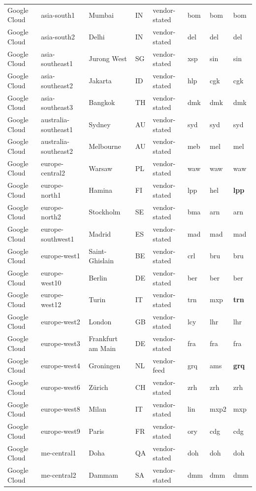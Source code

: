 \begin{longtable}{llllllll}
Google Cloud & asia-south1 & Mumbai & IN & vendor-stated & bom & bom & bom \\
Google Cloud & asia-south2 & Delhi & IN & vendor-stated & del & del & del \\
Google Cloud & asia-southeast1 & Jurong West & SG & vendor-stated & xsp & sin & sin \\
Google Cloud & asia-southeast2 & Jakarta & ID & vendor-stated & hlp & cgk & cgk \\
Google Cloud & asia-southeast3 & Bangkok & TH & vendor-stated & dmk & dmk & dmk \\
Google Cloud & australia-southeast1 & Sydney & AU & vendor-stated & syd & syd & syd \\
Google Cloud & australia-southeast2 & Melbourne & AU & vendor-stated & meb & mel & mel \\
Google Cloud & europe-central2 & Warsaw & PL & vendor-stated & waw & waw & waw \\
Google Cloud & europe-north1 & Hamina & FI & vendor-stated & lpp & hel & \textbf{lpp} \\
Google Cloud & europe-north2 & Stockholm & SE & vendor-stated & bma & arn & arn \\
Google Cloud & europe-southwest1 & Madrid & ES & vendor-stated & mad & mad & mad \\
Google Cloud & europe-west1 & Saint-Ghislain & BE & vendor-stated & crl & bru & bru \\
Google Cloud & europe-west10 & Berlin & DE & vendor-stated & ber & ber & ber \\
Google Cloud & europe-west12 & Turin & IT & vendor-stated & trn & mxp & \textbf{trn} \\
Google Cloud & europe-west2 & London & GB & vendor-stated & lcy & lhr & lhr \\
Google Cloud & europe-west3 & Frankfurt am Main & DE & vendor-stated & fra & fra & fra \\
Google Cloud & europe-west4 & Groningen & NL & vendor-feed & grq & ams & \textbf{grq} \\
Google Cloud & europe-west6 & Zürich & CH & vendor-stated & zrh & zrh & zrh \\
Google Cloud & europe-west8 & Milan & IT & vendor-stated & lin & mxp2 & mxp \\
Google Cloud & europe-west9 & Paris & FR & vendor-stated & ory & cdg & cdg \\
Google Cloud & me-central1 & Doha & QA & vendor-stated & doh & doh & doh \\
Google Cloud & me-central2 & Dammam & SA & vendor-stated & dmm & dmm & dmm \\

\end{longtable}
